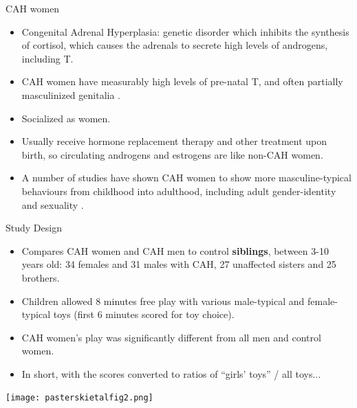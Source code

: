 \documentclass[hyperref={pdfpagelabels=false}]{beamer}
\begin{document}
\begin{frame}{CAH women}
	\begin{itemize}
	\item Congenital Adrenal Hyperplasia: genetic disorder which inhibits the synthesis of cortisol, which causes the adrenals to secrete high levels of androgens, including T.
	\item CAH women have measurably high levels of pre-natal T, and often partially masculinized genitalia \citep[][and refs therein]{pasterskietal2005, balthazart2011}.
	\item Socialized as women.
	\item Usually receive hormone replacement therapy and other treatment upon birth, so circulating androgens and estrogens are like non-CAH women.
	\item A number of studies have shown CAH women to show more masculine-typical behaviours from childhood into adulthood, including adult gender-identity and sexuality \citep[see][for reviews]{hines2006, balthazart2011}.
	\end{itemize}
\end{frame}


\begin{frame}{\citet{pasterskietal2005}}
\begin{block}{Study Design}

	\begin{itemize}
	\item Compares CAH women and CAH men to control \textbf{siblings}, between 3-10 years old: 34 females and 31 males with CAH, 27 unaffected sisters and 25 brothers.
	\item Children allowed 8 minutes free play with various male-typical and female-typical toys (first 6 minutes scored for toy choice).
	\item CAH women's play was significantly different from all men and control women.
	\item In short, with the scores converted to ratios of ``girls' toys'' / all toys...
	\end{itemize}
	\end{block}
\end{frame}



\begin{frame}{}
\begin{center}
	\texttt{[image: pasterskietalfig2.png]}
	\end{center}
\end{frame}
\end{document}

